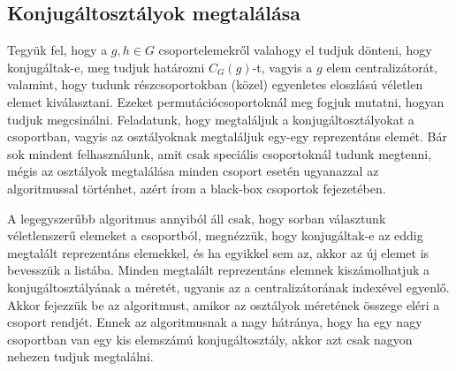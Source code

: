 \subsection{Konjugáltosztályok megtalálása}
\label{subsec:konj}
Tegyük fel, hogy a $g, h \in G$ csoportelemekről valahogy el tudjuk dönteni, hogy konjugáltak-e, meg tudjuk határozni $C_G(g)$-t, vagyis a $g$ elem centralizátorát, valamint,
hogy tudunk részcsoportokban (közel) egyenletes eloszlású véletlen elemet kiválasztani.
Ezeket permutációcsoportoknál meg fogjuk mutatni, hogyan tudjuk megcsinálni.
Feladatunk, hogy megtaláljuk a konjugáltosztályokat a csoportban, vagyis az osztályoknak megtaláljuk egy-egy reprezentáns elemét.
Bár sok mindent felhasználunk, amit csak speciális csoportoknál tudunk megtenni, mégis az osztályok megtalálása minden csoport esetén ugyanazzal az algoritmussal történhet,
azért írom a black-box csoportok fejezetében.

A legegyszerűbb algoritmus annyiból áll csak, hogy sorban választunk véletlenszerű elemeket a csoportból, megnézzük, hogy konjugáltak-e az eddig megtalált reprezentáns elemekkel,
és ha egyikkel sem az, akkor az új elemet is bevesszük a listába.
Minden megtalált reprezentáns elemnek kiszámolhatjuk a konjugáltosztályának a méretét, ugyanis az a centralizátorának indexével egyenlő.
Akkor fejezzük be az algoritmust, amikor az osztályok méretének összege eléri a csoport rendjét.
Ennek az algoritmusnak a nagy hátránya, hogy ha egy nagy csoportban van egy kis elemszámú konjugáltosztály, akkor azt csak nagyon nehezen tudjuk megtalálni.

